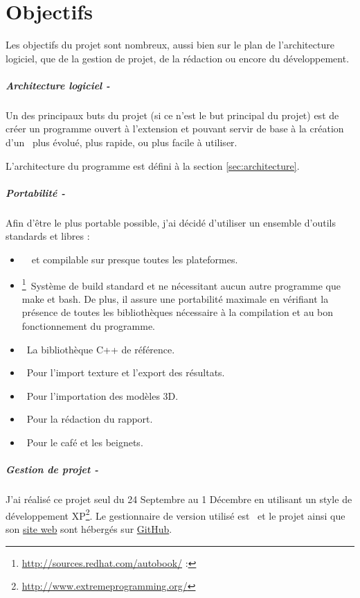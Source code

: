 \chapter{Objectifs}
Les objectifs du projet sont nombreux, aussi bien sur le plan de
l'architecture logiciel, que de la gestion de projet, de la rédaction ou
encore du développement.

\paragraph{Architecture logiciel -} Un des principaux buts du projet (si ce
n'est le but principal du projet) est de créer un programme ouvert à
l'extension et pouvant servir de base à la création d'un \ plus
évolué, plus rapide, ou plus facile à utiliser.

L'architecture du programme est défini à la section \ref{sec:architecture}.

\paragraph{Portabilité -} Afin d'être le plus portable possible, j'ai décidé
d'utiliser un ensemble d'outils standards et libres :
\begin{itemize}
  \item {}\ \ et compilable sur presque
    toutes les plateformes.
  \item {}\footnote{\url{http://sources.redhat.com/autobook/}
    :}\ Système de build standard et ne nécessitant aucun autre programme que
    make et bash. De plus, il assure une portabilité maximale en vérifiant la
    présence de toutes les bibliothèques nécessaire à la compilation et au bon
    fonctionnement du programme.
  \item {}\ La bibliothèque C++ de référence.
  \item {}\ Pour l'import texture et l'export des résultats.
  \item {}\ Pour l'importation des modèles 3D.
  \item \tsl{\LaTeX{} :}\ Pour la rédaction du rapport.\\

  \item {}\ Pour le café et les beignets.
\end{itemize}

\paragraph{Gestion de projet -} J'ai réalisé ce projet seul du 24 Septembre au
1 Décembre en utilisant un style de développement
\gls{XP}\footnote{\url{http://www.extremeprogramming.org/}}.  Le gestionnaire
de version utilisé est \ et le projet ainsi que son
\href{http://digitalguru.github.com/LyonRayTracer}{site web} sont hébergés sur
\href{http://github.com}{GitHub}.

